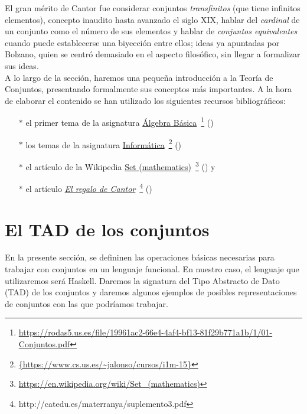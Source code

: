 El gran mérito de Cantor fue considerar conjuntos \textit{transfinitos} (que
tiene infinitos elementos), concepto inaudito hasta avanzado el siglo XIX,
hablar del \textit{cardinal} de un conjunto como el número de sus elementos y
hablar de \textit{conjuntos equivalentes} cuando puede establecerse una
biyección entre ellos; ideas ya apuntadas por Bolzano, quien se centró
demasiado en el aspecto filosófico, sin llegar a formalizar sus ideas.\\


A lo largo de la sección, haremos una pequeña introducción a la Teoría de
Conjuntos, presentando formalmente sus conceptos más importantes. A la hora de 
elaborar el contenido se han utilizado los siguientes recursos bibliográficos:

\begin{itemize}
\item[$*$] el primer tema de la asignatura
\href{https://rodas5.us.es/file/19961ac2-66e4-4af4-bf13-81f29b771a1b/1/01-Conjuntos.pdf}
     {Álgebra Básica}\
\footnote{\url{https://rodas5.us.es/file/19961ac2-66e4-4af4-bf13-81f29b771a1b/1/01-Conjuntos.pdf}}
(\cite{Algebra-15a})

\item[$*$] los temas de la asignatura 
\href{https://www.cs.us.es/~jalonso/cursos/i1m-15}
     {Informática}\
\footnote{\url{{https://www.cs.us.es/~jalonso/cursos/i1m-15}}}
(\cite{Alonso-15a}) 
 
\item[$*$] el artículo de la Wikipedia
\href{https://en.wikipedia.org/wiki/Set_(mathematics)}
     {Set (mathematics)}\
\footnote{\url{https://en.wikipedia.org/wiki/Set_(mathematics)}}
(\cite{Wikipedia-grafos}) y

\item[$*$] el artículo
\href{http://catedu.es/materranya/suplemento3.pdf}
     {\textit{El regalo de Cantor}}\
\footnote{http://catedu.es/materranya/suplemento3.pdf}
(\cite{Regalo-cantor})
\end{itemize}

\section{El TAD de los conjuntos}

\label{sec:TAD_conjuntos}

En la presente sección, se defininen las operaciones básicas necesarias
para trabajar con conjuntos en un lenguaje funcional. En nuestro caso, 
el lenguaje que utilizaremos será Haskell. Daremos la signatura del Tipo
Abstracto de Dato (TAD) de los conjuntos y daremos algunos ejemplos de 
posibles representaciones de conjuntos con las que podríamos trabajar.

